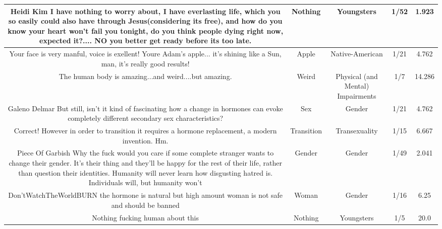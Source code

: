 \documentclass[11pt]{article}
\newlength\mylength
\begin{document}
\begin{center}
\begin{longtable}{|C{.40\mylength}|C{.30\mylength}|C{.15\mylength}|C{.15\mylength}|C{.15\mylength}|}
   Heidi Kim I have nothing to worry about, I have everlasting life, which you so easily could also have through Jesus(considering its free), and how do you know your heart won't fail you tonight, do you think people dying right now, expected it?.... NO  you better get ready before its too late.  & Nothing & Youngsters & 1/52 & 1.923 \\  \hline
  Your face is very manful, voice is exellent! Youre Adam's apple... it's shining like a Sun, man, it's really good results!  & Apple & Native-American & 1/21 & 4.762 \\  \hline
  The human body is amazing...and weird....but amazing.  & Weird & Physical (and Mental) Impairments & 1/7 & 14.286 \\  \hline
   Galeno Delmar But  still, isn't it kind of fascinating how a change in hormones can evoke completely different secondary sex characteristics?  & Sex & Gender & 1/21 & 4.762 \\  \hline
  Correct! However in order to transition it requires a hormone replacement, a modern invention. Hm.  & Transition & Transexuality & 1/15 & 6.667 \\  \hline
  Piece Of Garbish Why the fuck would you care if some complete stranger wants to change their gender. It's their thing and they'll be happy for the rest of their life, rather than question their identities. Humanity will never learn how disgusting hatred is. Individuals will, but humanity won't  & Gender & Gender & 1/49 & 2.041 \\  \hline
  Don'tWatchTheWorldBURN the hormone is natural but high  amount woman is not safe and should be banned  & Woman & Gender & 1/16 & 6.25 \\  \hline
  Nothing fucking human about this  & Nothing & Youngsters & 1/5 & 20.0 \\  \hline

\end{longtable}
\end{center}
\end{document}
